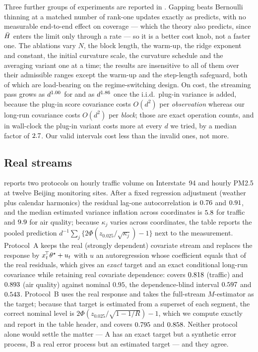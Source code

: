 Three further groups of experiments are reported in . Gapping beats
Bernoulli thinning at a matched number of rank-one updates exactly as  predicts, with no
measurable end-to-end effect on coverage --- which the theory also predicts, since $\bar{H}$ enters the limit
only through a rate --- so it is a better cost knob, not a faster one. The ablations vary $N$, the block
length, the warm-up, the ridge exponent and constant, the initial curvature scale, the curvature schedule
and the averaging variant one at a time; the results are insensitive to all of them over their admissible
ranges except the warm-up and the step-length safeguard, both of which are load-bearing on the
regime-switching design. On cost, the streaming pass grows as $d^{1.00}$ for \bgsn{} and as
$d^{1.86}$ once the i.i.d.\ plug-in variance is added, because the plug-in score covariance
costs $O(d^2)$ per \emph{observation} whereas our long-run covariance costs $O(d^2)$ per \emph{block};
those are exact operation counts, and in wall-clock the plug-in variant costs more at every $d$ we tried,
by a median factor of $2.7$. Our valid intervals cost less than the invalid ones, not more.

\subsection{Real streams}

 reports two protocols on hourly traffic volume on Interstate~94 and hourly PM2.5 at
twelve Beijing monitoring sites. After a fixed regression adjustment (weather plus calendar harmonics)
the residual lag-one autocorrelation is $0.76$ and $0.91$, and the median estimated
variance inflation across coordinates is $5.8$ for traffic and $9.9$ for air
quality; because $\kappa_j$ varies across coordinates, the table reports the pooled prediction
$d^{-1}\sum_j\{2\Phi(z_{0.025}/\sqrt{\kappa_j})-1\}$ next to the measurement. Protocol~A keeps the real
(strongly dependent) covariate stream and replaces the response by $x_t^{\!\top}\theta^\star+u_t$ with $u$ an
autoregression whose coefficient equals that of the real residuals, which gives an \emph{exact} target
and an exact conditional long-run covariance while retaining real covariate dependence: \bgsn{} covers
$0.818$ (traffic) and $0.893$ (air quality) against nominal $0.95$, the
dependence-blind interval $0.597$ and $0.543$. Protocol~B uses the real
response and takes the full-stream $M$-estimator as the target; because that target is estimated from a
superset of each segment, the correct nominal level is $2\Phi(z_{0.025}/\sqrt{1-1/R})-1$, which we
compute exactly and report in the table header, and \bgsn{} covers $0.795$ and
$0.858$. Neither protocol alone would settle the matter --- A has an exact target but a
synthetic error process, B a real error process but an estimated target --- and they agree.

